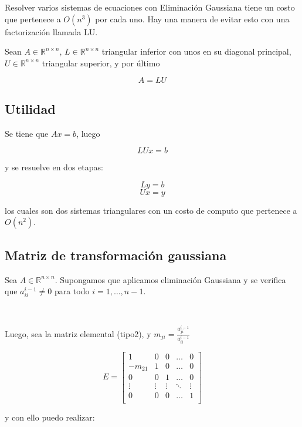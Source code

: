 
Resolver varios sistemas de ecuaciones con Eliminación Gaussiana tiene un costo que pertenece a $O(n^3)$ por cada uno. Hay una manera de evitar esto con una factorización llamada LU.

Sean $A \in \mathbb{R}^{n \times n}$, $L \in \mathbb{R}^{n \times n}$ triangular inferior con unos en su diagonal principal, $U \in \mathbb{R}^{n \times n}$ triangular superior, y por último 

\[A = LU\]

\subsection{Utilidad}
\label{subsec:utilidad_lu}

Se tiene que $Ax = b$, luego

\[LUx = b\]

y se resuelve en dos etapas:

\[Ly = b\]
\[Ux = y\]

los cuales son dos sistemas triangulares con un costo de computo que pertenece a $O(n^2)$.

\subsection{Matriz de transformación gaussiana}
\label{subsec:matriz_de_transformacion_gaussiana}

Sea $A \in \mathbb{R}^{n \times n}$. Supongamos que aplicamos eliminación Gaussiana y se verifica que $a_{ii}^{i - 1}  \neq 0$ para todo $i = 1,\ldots,n-1$.

\

Luego, sea la matriz elemental (tipo2), y $m_{ji} = \frac{a_{ji}^{i-1}}{a_{ii}^{i-1}}$

\[
E = 
\begin{bmatrix}
1 & 0 & 0 & \ldots & 0 \\
-m_{21} & 1 & 0 & \ldots & 0 \\
0 & 0 & 1 & \ldots & 0 \\
\vdots & \vdots & \vdots & \ddots & \vdots \\
0 & 0 & 0 & \ldots & 1 \\
\end{bmatrix}
\]

y con ello puedo realizar:

